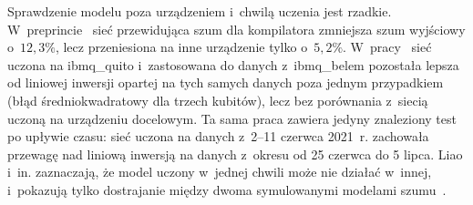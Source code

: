 Sprawdzenie modelu poza urządzeniem i~chwilą uczenia jest rzadkie.
W~preprincie~\cite{zlokapa_deep_2020} sieć przewidująca szum dla kompilatora zmniejsza szum wyjściowy o~$12{,}3\%$, lecz przeniesiona na inne urządzenie tylko o~$5{,}2\%$.
W~pracy~\cite{kim_quantum_2022} sieć uczona na ibmq\_quito i~zastosowana do danych z~ibmq\_belem pozostała lepsza od liniowej inwersji opartej na tych samych danych poza jednym przypadkiem (błąd średniokwadratowy dla trzech kubitów), lecz bez porównania z~siecią uczoną na urządzeniu docelowym.
Ta sama praca zawiera jedyny znaleziony test po upływie czasu: sieć uczona na danych z~2--11 czerwca 2021~r. zachowała przewagę nad liniową inwersją na danych z~okresu od 25 czerwca do 5 lipca.
Liao i~in. zaznaczają, że model uczony w~jednej chwili może nie działać w~innej, i~pokazują tylko dostrajanie między dwoma symulowanymi modelami szumu~\cite{liao_machine_2024}.

